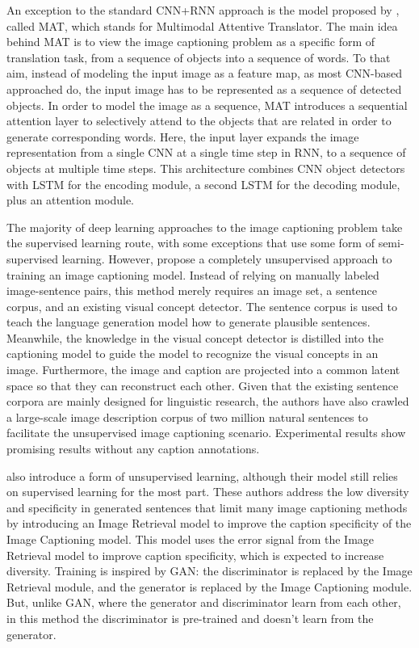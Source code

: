 An exception to the standard CNN+RNN approach is the model proposed by \citet{Liu2017_MAT}, called MAT, which stands for Multimodal Attentive Translator. The main idea behind MAT is to view the image captioning problem as a specific form of translation task, from a sequence of objects into a sequence of words. To that aim, instead of modeling the input image as a feature map, as most CNN-based approached do, the input image has to be represented as a sequence of detected objects. In order to model the image as a sequence, MAT introduces a sequential attention layer to selectively attend to the objects that are related in order to generate corresponding words. Here, the input layer expands the image representation from a single CNN at a single time step in RNN, to a sequence of objects at multiple time steps. This architecture combines CNN object detectors with LSTM for the encoding module, a second  LSTM for the decoding module, plus an attention module.

The majority of deep learning approaches to the image captioning problem take the supervised learning route, with some exceptions that use some form of semi-supervised learning\citep{Pu2016_VAE, Anderson2018_SemiSup}. However, \citet{Feng2018} propose a completely unsupervised approach to training an image captioning model. Instead of relying on manually labeled image-sentence pairs, this method merely requires an image set, a sentence corpus, and an existing visual concept detector. The sentence corpus is used to teach the language generation model how to generate plausible sentences. Meanwhile, the knowledge in the visual concept detector is distilled into the captioning model to guide the model to recognize the visual concepts in an image. Furthermore, the image and caption are projected into a common latent space so that they can reconstruct each other. Given that the existing sentence corpora are mainly designed for linguistic research, the authors have also crawled a large-scale image description corpus of two million natural sentences to facilitate the unsupervised image captioning scenario. Experimental results show promising results without any caption annotations.

\citet{Lindh2018} also introduce a form of unsupervised learning, although their model still relies on supervised learning for the most part. These authors address the low diversity and specificity in generated sentences that limit many image captioning methods by introducing an Image Retrieval model to improve the caption specificity of the Image Captioning model. This model uses the error signal from the Image Retrieval model to improve caption specificity, which is expected to increase diversity. Training is inspired by GAN: the discriminator is replaced by the Image Retrieval module, and the generator is replaced by the Image Captioning module. But, unlike GAN, where the generator and discriminator learn from each other, in this method the discriminator is pre-trained and doesn't learn from the generator. 

